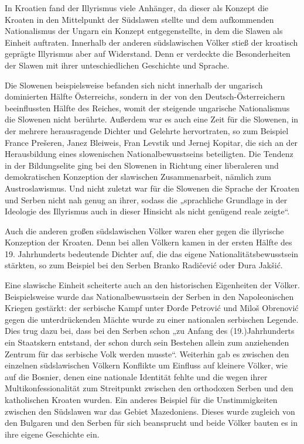 \documentclass[12pt,headsepline,a4paper]{scrartcl}
\begin{document}
In Kroatien fand der Illyrismus viele Anhänger, da dieser als Konzept die Kroaten in den
Mittelpunkt der Südslawen stellte und dem aufkommenden Nationalismus der Ungarn ein
Konzept entgegenstellte, in dem die Slawen als Einheit auftraten.
Innerhalb der anderen südslawischen Völker stieß der kroatisch geprägte Illyrismus aber auf
Widerstand. Denn er verdeckte die Besonderheiten der Slawen mit ihrer unteschiedlichen
Geschichte und Sprache.

Die Slowenen beispielsweise befanden sich nicht innerhalb der ungarisch dominierten Hälfte
Österreichs, sondern in der von den Deutsch-Österreichern beeinflussten Hälfte des Reiches,
womit der steigende ungarische Nationalismus die Slowenen nicht berührte. Außerdem war es
auch eine Zeit für die Slowenen, in der mehrere herausragende Dichter und Gelehrte
hervortraten, so zum Beispiel France Prešeren, Janez Bleiweis, Fran Levstik und Jernej
Kopitar, die sich an der Herausbildung eines slowenischen Nationalbewusstseins beteiligten.
Die Tendenz in der Bildungselite ging bei den Slowenen in Richtung einer liberaleren und
demokratischen Konzeption der slawischen Zusammenarbeit, nämlich zum Austroslawismus.
\autocite[64]{kohn} Und nicht zuletzt war für die Slowenen die Sprache der Kroaten und
Serben nicht nah genug an ihrer, sodass die „sprachliche Grundlage in der Ideologie des
Illyrismus auch in dieser Hinsicht als nicht genügend reale zeigte“\autocite[81]{shidak}.

Auch die anderen großen südslawischen Völker waren eher gegen die illyrische Konzeption
der Kroaten. Denn bei allen Völkern kamen in der ersten Hälfte des 19. Jahrhunderts
bedeutende Dichter auf, die das eigene Nationalitätsbewusstsein stärkten, so zum Beispiel bei
den Serben Branko Radičević oder Đura Jakšić.

Eine slawische Einheit scheiterte auch an den historischen Eigenheiten der Völker.
Beispielsweise wurde das Nationalbewusstsein der Serben in den Napoleonischen Kriegen
gestärkt: der serbische Kampf unter Đorđe Petrović und Miloš Obrenović gegen die
unterdrückenden Mächte wurde zu einer nationalen serbischen Legende. Dies trug dazu bei,
dass bei den Serben schon „zu Anfang des (19.)Jahrhunderts ein Staatskern entstand, der
schon durch sein Bestehen allein zum anziehenden Zentrum für das serbische Volk werden
musste“\autocite[77]{shidak}. Weiterhin gab es zwischen den einzelnen südslawischen Völkern
Konflikte um Einfluss auf kleinere Völker, wie auf die Bosnier, denen eine nationale Identität
fehlte und die wegen ihrer Multikonfessionalität zum Streitpunkt zwischen den orthodoxen
Serben und den katholischen Kroaten wurden. Ein anderes Beispiel für die Unstimmigkeiten
zwischen den Südslawen war das Gebiet Mazedoniens. Dieses wurde zugleich von den
Bulgaren und den Serben für sich beansprucht und beide Völker bauten es in ihre eigene
Geschichte ein.
\end{document}

